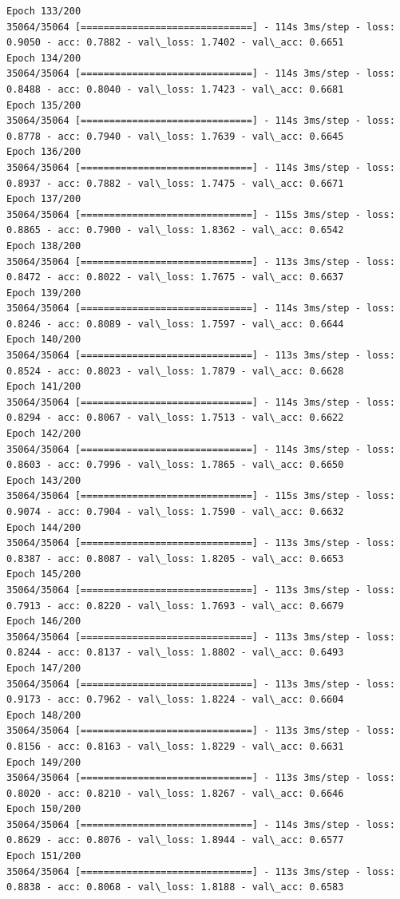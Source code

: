 \documentclass[11pt]{article}
\begin{document}
\begin{Verbatim}[commandchars=\\\{\}]
Epoch 133/200
35064/35064 [==============================] - 114s 3ms/step - loss: 0.9050 - acc: 0.7882 - val\_loss: 1.7402 - val\_acc: 0.6651
Epoch 134/200
35064/35064 [==============================] - 114s 3ms/step - loss: 0.8488 - acc: 0.8040 - val\_loss: 1.7423 - val\_acc: 0.6681
Epoch 135/200
35064/35064 [==============================] - 114s 3ms/step - loss: 0.8778 - acc: 0.7940 - val\_loss: 1.7639 - val\_acc: 0.6645
Epoch 136/200
35064/35064 [==============================] - 114s 3ms/step - loss: 0.8937 - acc: 0.7882 - val\_loss: 1.7475 - val\_acc: 0.6671
Epoch 137/200
35064/35064 [==============================] - 115s 3ms/step - loss: 0.8865 - acc: 0.7900 - val\_loss: 1.8362 - val\_acc: 0.6542
Epoch 138/200
35064/35064 [==============================] - 113s 3ms/step - loss: 0.8472 - acc: 0.8022 - val\_loss: 1.7675 - val\_acc: 0.6637
Epoch 139/200
35064/35064 [==============================] - 114s 3ms/step - loss: 0.8246 - acc: 0.8089 - val\_loss: 1.7597 - val\_acc: 0.6644
Epoch 140/200
35064/35064 [==============================] - 113s 3ms/step - loss: 0.8524 - acc: 0.8023 - val\_loss: 1.7879 - val\_acc: 0.6628
Epoch 141/200
35064/35064 [==============================] - 114s 3ms/step - loss: 0.8294 - acc: 0.8067 - val\_loss: 1.7513 - val\_acc: 0.6622
Epoch 142/200
35064/35064 [==============================] - 114s 3ms/step - loss: 0.8603 - acc: 0.7996 - val\_loss: 1.7865 - val\_acc: 0.6650
Epoch 143/200
35064/35064 [==============================] - 115s 3ms/step - loss: 0.9074 - acc: 0.7904 - val\_loss: 1.7590 - val\_acc: 0.6632
Epoch 144/200
35064/35064 [==============================] - 113s 3ms/step - loss: 0.8387 - acc: 0.8087 - val\_loss: 1.8205 - val\_acc: 0.6653
Epoch 145/200
35064/35064 [==============================] - 113s 3ms/step - loss: 0.7913 - acc: 0.8220 - val\_loss: 1.7693 - val\_acc: 0.6679
Epoch 146/200
35064/35064 [==============================] - 113s 3ms/step - loss: 0.8244 - acc: 0.8137 - val\_loss: 1.8802 - val\_acc: 0.6493
Epoch 147/200
35064/35064 [==============================] - 113s 3ms/step - loss: 0.9173 - acc: 0.7962 - val\_loss: 1.8224 - val\_acc: 0.6604
Epoch 148/200
35064/35064 [==============================] - 113s 3ms/step - loss: 0.8156 - acc: 0.8163 - val\_loss: 1.8229 - val\_acc: 0.6631
Epoch 149/200
35064/35064 [==============================] - 113s 3ms/step - loss: 0.8020 - acc: 0.8210 - val\_loss: 1.8267 - val\_acc: 0.6646
Epoch 150/200
35064/35064 [==============================] - 114s 3ms/step - loss: 0.8629 - acc: 0.8076 - val\_loss: 1.8944 - val\_acc: 0.6577
Epoch 151/200
35064/35064 [==============================] - 113s 3ms/step - loss: 0.8838 - acc: 0.8068 - val\_loss: 1.8188 - val\_acc: 0.6583

\end{Verbatim}
\end{document}
